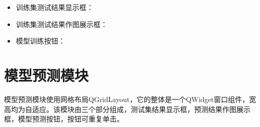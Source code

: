 \documentclass[cn,11pt,chinese]{elegantbook}
\begin{document}
\begin{itemize}
	\item 训练集测试结果显示框：
	\item 训练集测试结果作图展示框：
	\item 模型训练按钮：
\end{itemize}

\section{模型预测模块}

模型预测模块使用网格布局QGridLayout，它的整体是一个QWidget窗口组件，宽高均为自适应。该模块由三个部分组成，测试集结果显示框，预测结果作图展示框，模型预测按钮，按钮可重复单击。

\begin{figure}
	\centering
\end{figure}
\end{document}
